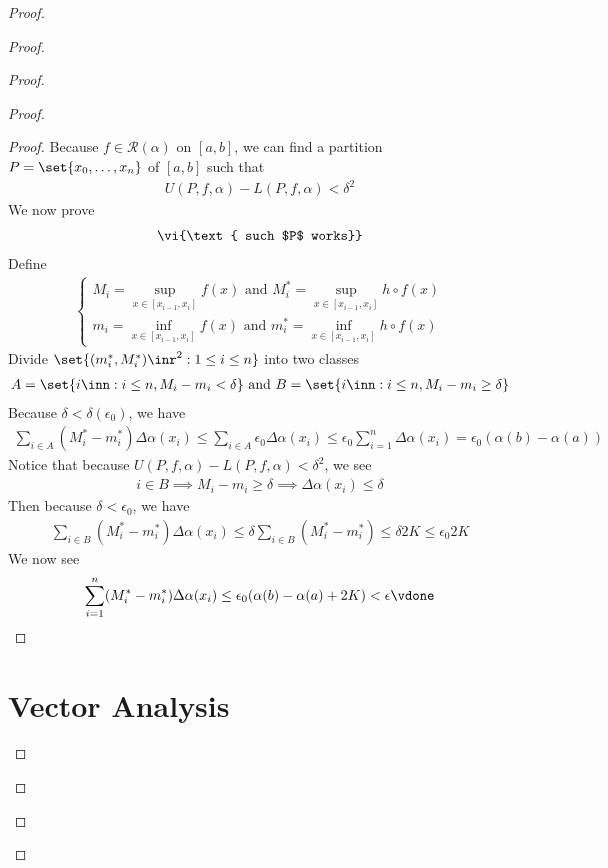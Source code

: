 \documentclass{report}
\begin{document}
\begin{proof}
\begin{proof}
\begin{proof}
\begin{proof}
\begin{proof}
Because $f\in \mathscr{R}(\alpha )$ on $[a,b]$, we can find a partition $P=\set{x_0,\dots ,x_n}$ of $[a,b]$ such that 
\begin{align*}
U(P,f,\alpha )-L(P,f,\alpha )<\delta^2
\end{align*}
We now prove 
\begin{align*}
\vi{\text{ such $P$ works}}
\end{align*}
Define 
\begin{align*}
  \begin{cases}
    M_i=\sup_{x\in [x_{i-1},x_i]} f(x)\text{ and }M_i^*=\sup_{x\in [x_{i-1},x_i]}h \circ f(x)\\
    m_i=\inf_{x\in [x_{i-1},x_i]} f(x)\text{ and }m_i^*=\inf_{x\in [x_{i-1},x_i]}h \circ f(x)
  \end{cases}
\end{align*}
Divide $\set{(m_i^*,M_i^*)\inr^2:1\leq i\leq n}$ into two classes
\begin{align*}
 A= \set{i\inn: i\leq n,M_i - m_i <\delta}\text{ and }B=\set{i\inn:i\leq n,M_i-m_i \geq \delta}
\end{align*}
Because $\delta<\delta(\epsilon_0 )$, we have
\begin{align*}
\sum_{i \in A}(M_i^*-m_i^*)\Delta \alpha (x_i) \leq \sum_{i \in A}\epsilon_0 \Delta \alpha (x_i)\leq \epsilon_0 \sum_{i=1}^n \Delta \alpha (x_i)=\epsilon_0(\alpha (b)-\alpha (a))
\end{align*}
Notice that because $U(P,f,\alpha )-L(P,f,\alpha )<\delta^2$, we see 
\begin{align*}
i \in B \implies M_i-m_i\geq \delta \implies \Delta \alpha (x_i)\leq \delta
\end{align*}
Then because $\delta<\epsilon_0 $, we have 
\begin{align*}
\sum_{i \in B}(M_i^*-m_i^*)\Delta \alpha (x_i)\leq \delta \sum_{i \in B} (M_i^*-m_i^*)\leq \delta 2K\leq \epsilon_0  2K
\end{align*}
We now see 
\begin{align*}
  \sum_{i=1}^n (M_i^*-m_i^*)\Delta \alpha (x_i)\leq \epsilon_0(\alpha (b)-\alpha (a)+2K)<\epsilon \vdone
\end{align*}
\end{proof}


\chapter{Vector Analysis}

\end{proof}
\end{proof}
\end{proof}
\end{proof}
\end{document}
